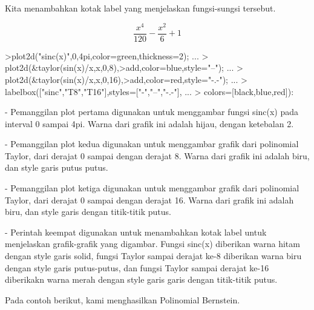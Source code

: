 \documentclass[a4paper,10pt]{article}
\begin{document}
\begin{eulernotebook}
\begin{eulercomment}
\begin{eulercomment}
\begin{eulercomment}
\begin{eulercomment}
\begin{eulercomment}
\begin{eulercomment}
\begin{eulercomment}
Kita menambahkan kotak label yang menjelaskan fungsi-sungsi tersebut.
\end{eulercomment}
\begin{eulerformula}
\[
\frac{x^4}{120}-\frac{x^2}{6}+1
\]
\end{eulerformula}
\begin{eulerprompt}
>plot2d("sinc(x)",0,4pi,color=green,thickness=2); ...
>  plot2d(&taylor(sin(x)/x,x,0,8),>add,color=blue,style="--"); ...
>  plot2d(&taylor(sin(x)/x,x,0,16),>add,color=red,style="-.-"); ...
>  labelbox(["sinc","T8","T16"],styles=["-","--","-.-"], ...
>    colors=[black,blue,red]):
\end{eulerprompt}
\begin{eulercomment}
- Pemanggilan plot pertama digunakan untuk menggambar fungsi sinc(x)
pada interval 0 sampai 4pi. Warna dari grafik ini adalah hijau, dengan
ketebalan 2.

- Pemanggilan plot kedua digunakan untuk menggambar grafik dari
polinomial Taylor, dari derajat 0 sampai dengan derajat 8. Warna dari
grafik ini adalah biru, dan style garis putus putus.

- Pemanggilan plot ketiga digunakan untuk menggambar grafik dari
polinomial Taylor, dari derajat 0 sampai dengan derajat 16. Warna dari
grafik ini adalah biru, dan style garis dengan titik-titik putus.

- Perintah keempat digunakan untuk menambahkan kotak label untuk
menjelaskan grafik-grafik yang digambar. Fungsi sinc(x) diberikan
warna hitam dengan style garis solid, fungsi Taylor sampai derajat
ke-8 diberikan warna biru dengan style garis putus-putus, dan fungsi
Taylor sampai derajat ke-16 diberikakn warna merah dengan style garis
garis dengan titik-titik putus.

Pada contoh berikut, kami menghasilkan Polinomial Bernstein.


\end{eulercomment}
\end{eulercomment}
\end{eulercomment}
\end{eulercomment}
\end{eulercomment}
\end{eulercomment}
\end{eulercomment}
\end{eulernotebook}
\end{document}
